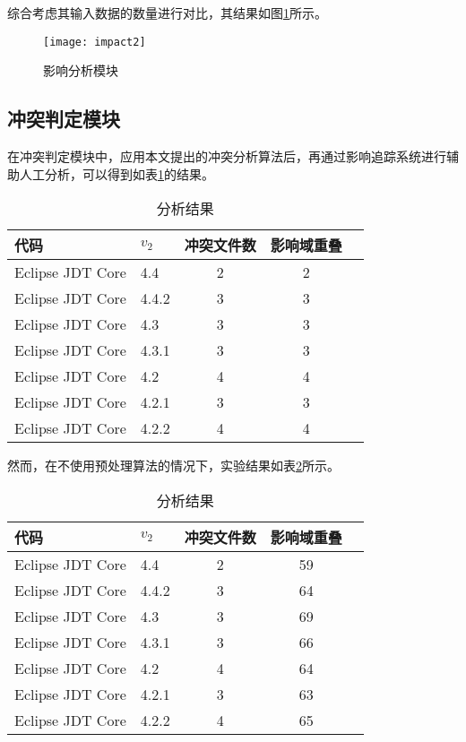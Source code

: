 综合考虑其输入数据的数量进行对比，其结果如图\ref {impact2}所示。

\begin{figure}[H]
	\centering
	\texttt{[image: impact2]}
	\caption {影响分析模块}
	\label {impact2}	
\end{figure}


\subsection{冲突判定模块}

在冲突判定模块中，应用本文提出的冲突分析算法后，再通过影响追踪系统进行辅助人工分析，可以得到如表\ref {data_compatible}的结果。

\begin{table}[H]
	\caption{分析结果}
	\label{data_compatible}
	\centering
	\begin{tabular}{llccc}
		\toprule[1.5pt]
		{\heiti 代码} & {\heiti $v_2$} & {\heiti 冲突文件数} & {\heiti 影响域重叠}  \\\midrule[1pt]
		Eclipse JDT Core & 4.4 	& 2 & 2 \\
		Eclipse JDT Core & 4.4.2 & 3 & 3 \\
		Eclipse JDT Core & 4.3 	& 3 & 3 \\
		Eclipse JDT Core & 4.3.1 & 3 & 3 \\
		Eclipse JDT Core & 4.2 	& 4 & 4 \\
		Eclipse JDT Core & 4.2.1 & 3  &	3 \\
		Eclipse JDT Core & 4.2.2 & 4 & 4 \\
		\bottomrule[1.5pt]
	\end{tabular}
\end{table}

然而，在不使用预处理算法的情况下，实验结果如表\ref {data_compatible_2}所示。

\begin{table}[H]
	\caption{分析结果}
	\label{data_compatible_2}
	\centering
	\begin{tabular}{llccc}
		\toprule[1.5pt]
		{\heiti 代码} & {\heiti $v_2$} & {\heiti 冲突文件数} & {\heiti 影响域重叠} \\\midrule[1pt]
		Eclipse JDT Core & 4.4 	& 2 & 59 \\
		Eclipse JDT Core & 4.4.2 & 3 & 64 \\
		Eclipse JDT Core & 4.3 	& 3 & 69 \\
		Eclipse JDT Core & 4.3.1 & 3 & 66 \\
		Eclipse JDT Core & 4.2 	& 4 & 64 \\
		Eclipse JDT Core & 4.2.1 & 3 & 63 \\
		Eclipse JDT Core & 4.2.2 & 4 & 65 \\
		\bottomrule[1.5pt]
	\end{tabular}
\end{table}

